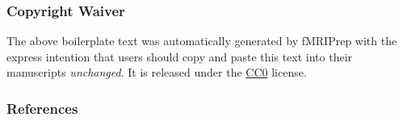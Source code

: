 \documentclass[
]{article}
\begin{document}
\subsubsection{Copyright Waiver}\label{copyright-waiver}

The above boilerplate text was automatically generated by fMRIPrep with
the express intention that users should copy and paste this text into
their manuscripts \emph{unchanged}. It is released under the
\href{https://creativecommons.org/publicdomain/zero/1.0/}{CC0} license.

\subsubsection{References}\label{references}

  
\end{document}
